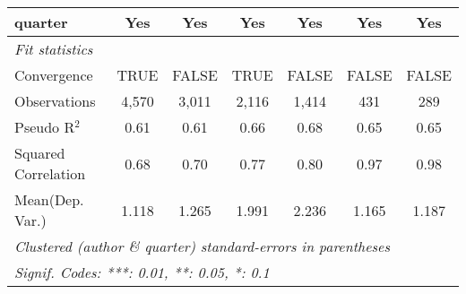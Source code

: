\begin{tabular}{lcccccc}
   quarter                                                    & Yes          & Yes           & Yes           & Yes          & Yes           & Yes\\  
   \midrule
   \emph{Fit statistics}\\
   Convergence                                                &TRUE          & FALSE         & TRUE          & FALSE        & FALSE         & FALSE\\  
   Observations                                               & 4,570        & 3,011         & 2,116         & 1,414        & 431           & 289\\  
   Pseudo R$^2$                                               & 0.61         & 0.61          & 0.66          & 0.68         & 0.65          & 0.65\\  
   Squared Correlation                                        & 0.68         & 0.70          & 0.77          & 0.80         & 0.97          & 0.98\\  
Mean(Dep. Var.) & 1.118 & 1.265 & 1.991 & 2.236 & 1.165 & 1.187 \\
   \midrule \midrule
   \multicolumn{7}{l}{\emph{Clustered (author \& quarter) standard-errors in parentheses}}\\
   \multicolumn{7}{l}{\emph{Signif. Codes: ***: 0.01, **: 0.05, *: 0.1}}\\
\end{tabular}
\par\endgroup
